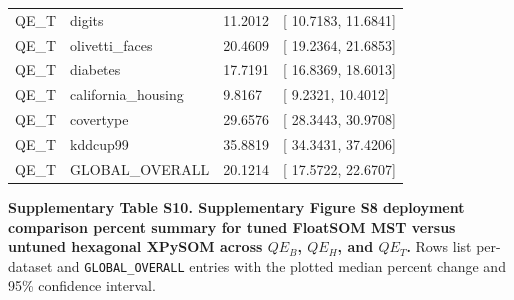 \documentclass[
]{article}
\providecommand{\DIFadd}[1]{{\protect\color{blue} #1}} %
\providecommand{\DIFaddbegin}{} %
\providecommand{\DIFaddend}{} %
\begin{document}
{\begin{longtable}[]{@{}llll@{}}
\DIFadd{QE\_T }& \DIFadd{digits }& \DIFadd{11.2012 }& {[}\DIFadd{10.7183, 11.6841}{]} \\
\DIFadd{QE\_T }& \DIFadd{olivetti\_faces }& \DIFadd{20.4609 }& {[}\DIFadd{19.2364, 21.6853}{]} \\
\DIFadd{QE\_T }& \DIFadd{diabetes }& \DIFadd{17.7191 }& {[}\DIFadd{16.8369, 18.6013}{]} \\
\DIFadd{QE\_T }& \DIFadd{california\_housing }& \DIFadd{9.8167 }& {[}\DIFadd{9.2321, 10.4012}{]} \\
\DIFadd{QE\_T }& \DIFadd{covertype }& \DIFadd{29.6576 }& {[}\DIFadd{28.3443, 30.9708}{]} \\
\DIFadd{QE\_T }& \DIFadd{kddcup99 }& \DIFadd{35.8819 }& {[}\DIFadd{34.3431, 37.4206}{]} \\
\DIFadd{QE\_T }& \DIFadd{GLOBAL\_OVERALL }& \DIFadd{20.1214 }& {[}\DIFadd{17.5722, 22.6707}{]} \\
\end{longtable}
}

\DIFaddend \textbf{Supplementary Table S10. Supplementary Figure  \DIFaddbegin \DIFadd{S8 }\DIFaddend deployment
comparison percent summary for tuned FloatSOM MST versus  \DIFaddbegin \DIFadd{untuned
}\DIFaddend hexagonal XPySOM across \(QE_B\), \(QE_H\), and \(QE_T\).} Rows list
per-dataset and \texttt{GLOBAL\_OVERALL} entries with the plotted median
percent change and 95\% confidence interval.
\end{document}
